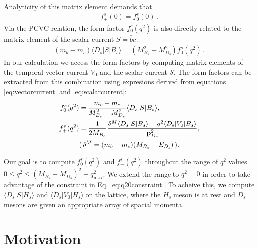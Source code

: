 Analyticity of this matrix element demands that
\begin{align}
  f_+^s(0) = f_0^s(0)\,.
  \label{eq:q20constraint}
\end{align}
Via the PCVC relation, the form factor $f_0^s(q^2)$ is also directly related to the matrix element of the scalar current $S=\bar{b}c\,$:
\begin{align}
  (m_b-m_c)\langle D_s | S | B_s \rangle = (M^2_{B_s} - M^2_{D_s}) f_0^s(q^2)\,.
    \label{eq:scalarcurrent}
\end{align}
In our calculation we access the form factors by computing matrix elements of the temporal vector current $V_0$ and the scalar current $S$. The form factors can be extracted from this combination using expresions derived from equations \eqref{eq:vectorcurrent} and \eqref{eq:scalarcurrent}:
\begin{align}
  f_0^s(q^2) &= {m_b - m_c\over M_{B_s}^2 - M_{D_s}^2 } \langle D_s | S | B_s \rangle, \\
  f_+^s(q^2) &= {1\over 2M_{B_s}} { \delta^M \langle D_s | S | B_s \rangle - q^2 \langle D_s | V_0 | B_s \rangle \over {\bf{p}}^2_{D_s}}, \\
    &( \, \delta^M = (m_b - m_c)(M_{B_s}-E_{D_s}) \, ). \nonumber
\end{align}

Our goal is to compute $f_0^s(q^2)$ and $f_+^s(q^2)$ throughout the range of $q^2$ values $0 \leq q^2 \leq (M_{B_s}-M_{D_s})^2 \equiv q^2_{\text{max}}$. We extend the range to $q^2=0$ in order to take advantage of the constraint in Eq. \eqref{eq:q20constraint}. To acheive this, we compute $\langle D_s | S | H_s \rangle$ and $\langle D_s | V_0 | H_s \rangle$ on the lattice, where the $H_s$ meson is at rest and $D_s$ mesons are given an appropriate array of spacial momenta.


\section{Motivation}
\label{sec:BsDs_intro}


